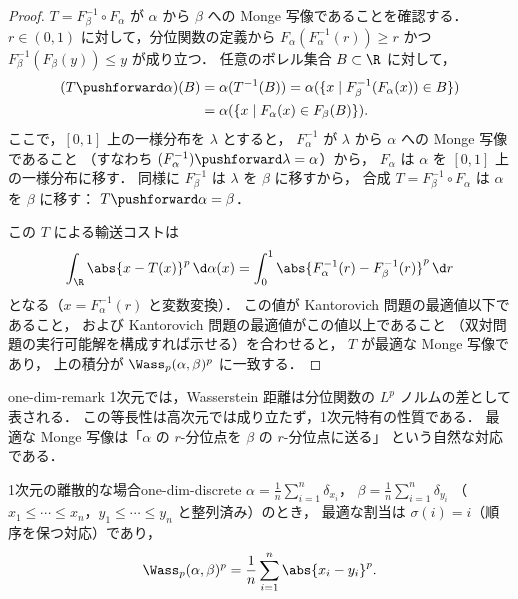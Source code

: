 \begin{proof}
  $T = F_\beta^{-1} \circ F_\alpha$ が $\alpha$ から $\beta$ への Monge 写像であることを確認する．
  $r \in (0, 1)$ に対して，分位関数の定義から
  $F_\alpha(F_\alpha^{-1}(r)) \geq r$ かつ $F_\beta^{-1}(F_\beta(y)) \leq y$ が成り立つ．
  任意のボレル集合 $B \subset \R$ に対して，
  \begin{align*}
    (T\pushforward \alpha)(B)
    &= \alpha(T^{-1}(B))
    = \alpha(\{x \mid F_\beta^{-1}(F_\alpha(x)) \in B\}) \\
    &= \alpha(\{x \mid F_\alpha(x) \in F_\beta(B)\}).
  \end{align*}
  ここで，$[0, 1]$ 上の一様分布を $\lambda$ とすると，
  $F_\alpha^{-1}$ が $\lambda$ から $\alpha$ への Monge 写像であること
  （すなわち $(F_\alpha^{-1})\pushforward \lambda = \alpha$）から，
  $F_\alpha$ は $\alpha$ を $[0,1]$ 上の一様分布に移す．
  同様に $F_\beta^{-1}$ は $\lambda$ を $\beta$ に移すから，
  合成 $T = F_\beta^{-1} \circ F_\alpha$ は $\alpha$ を $\beta$ に移す：
  $T\pushforward \alpha = \beta$．

  この $T$ による輸送コストは
  \[
    \int_\R \abs{x - T(x)}^p \, \d\alpha(x)
    = \int_0^1 \abs{F_\alpha^{-1}(r) - F_\beta^{-1}(r)}^p \, \d r
  \]
  となる（$x = F_\alpha^{-1}(r)$ と変数変換）．
  この値が Kantorovich 問題の最適値以下であること，
  および Kantorovich 問題の最適値がこの値以上であること
  （双対問題の実行可能解を構成すれば示せる）を合わせると，
  $T$ が最適な Monge 写像であり，
  上の積分が $\Wass_p(\alpha, \beta)^p$ に一致する．
\end{proof}

\begin{remark}{}{one-dim-remark}
  1次元では，Wasserstein 距離は分位関数の $L^p$ ノルムの差として表される．
  この等長性は高次元では成り立たず，1次元特有の性質である．
  最適な Monge 写像は「$\alpha$ の $r$-分位点を $\beta$ の $r$-分位点に送る」
  という自然な対応である．
\end{remark}

\begin{example}{1次元の離散的な場合}{one-dim-discrete}
  $\alpha = \frac{1}{n}\sum_{i=1}^n \delta_{x_i}$，
  $\beta = \frac{1}{n}\sum_{i=1}^n \delta_{y_i}$
  （$x_1 \leq \cdots \leq x_n$，$y_1 \leq \cdots \leq y_n$ と整列済み）のとき，
  最適な割当は $\sigma(i) = i$（順序を保つ対応）であり，
  \[
    \Wass_p(\alpha, \beta)^p = \frac{1}{n} \sum_{i=1}^n \abs{x_i - y_i}^p.
  \]
\end{example}

